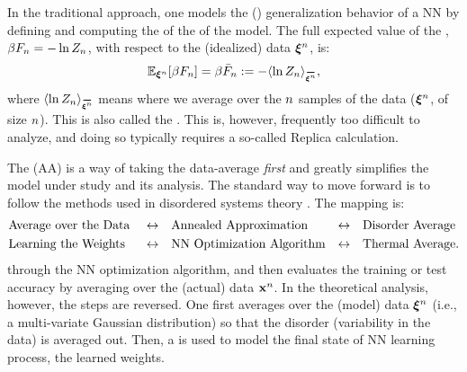 In the traditional \SMOG approach, one models the (\Typical) generalization behavior of a NN
by defining and computing the \ExpectedValue of the \FreeEnergy of the model.
The full expected value  of the \FreeEnergy, $\beta F_{n}=-\ln Z_{n}$, with respect to the (idealized) data $\boldsymbol{\xi}^{n}$, is:
\begin{align}
\label{eqn:mm_f_bar}
  \mathbb{E}_{\NDXIn}[\beta F_{\ND}]=\beta\bar{F}_{\ND}:=-\langle \ln Z_{\ND}\rangle_{\AVGNDXIn},
\end{align}
where $\langle \ln Z_{\ND}\rangle_{\AVGNDXIn}$ means where we average over  the $n$ samples of the data ($\boldsymbol{\xi}^{n}$, of size $n$).  This is also called the \Quenched \FreeEnergy.
This is, however,  frequently too difficult to analyze, and doing so typically
requires a so-called Replica calculation. 

The \AnnealedApproximation (AA) is a way of taking the data-average \emph{first} and greatly
simplifies the model under study and its analysis.  The standard way to move forward is to follow the methods used
in disordered systems theory \cite{SST92, EB01_BOOK}.
The mapping is:
\begin{align*}
  &\mbox{Average over the Data }&\leftrightarrow& \quad\mbox{Annealed Approximation}    &\leftrightarrow& \quad\mbox{Disorder Average} \\
  &\mbox{Learning the Weights }      &\leftrightarrow& \quad\mbox{NN Optimization Algorithm} &\leftrightarrow& \quad\mbox{Thermal Average}  .
\end{align*}
  through the NN optimization algorithm,
  and then evaluates the training or test accuracy
  by averaging over the (actual) data $\mathbf{x}^{n}$.
  In the theoretical analysis, however, the steps are reversed.
  One first averages over the (model) data $\boldsymbol{\xi}^{n}$ (i.e., a multi-variate Gaussian distribution)
  so that the disorder (variability in the data) is averaged out.
  Then, a \ThermalAverage is used to model the final state of NN learning process, the learned weights.

